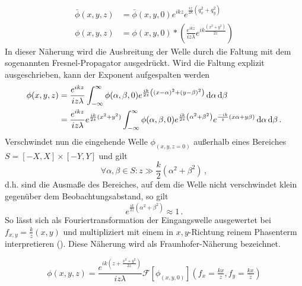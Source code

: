 \begin{align}
	\bar{\phi}(x,y, z) & =\bar{\phi}(x,y,0) e^{ik z}e^{\frac{i z}{2k}(q_x^2+q_y^2)} 
	\label{eq:fresnel_fourier}\\
	\phi(x,y, z)       & =\phi(x,y,0) \ast \left(                                   
	\frac{e^{ik z}}{i z \lambda } 
	e^{ik\frac{(x^2+y^2)}{2 z}}
	\right)
	\label{eq:fresnel_real}
\end{align}
In dieser Näherung wird die Ausbreitung der Welle durch die Faltung mit dem sogenannten Fresnel-Propagator ausgedrückt. Wird die Faltung explizit ausgeschrieben, kann der Exponent aufgespalten werden
\begin{align}
\label{eq:fresnel_explizit}
	\phi(x,y, z) & =\frac{e^{ikz}}{iz\lambda}                           
	\int_{-\infty}^\infty 
	\phi(\alpha,\beta,0)
	e^{\frac{ik}{2z}\left(\left(x-\alpha\right)^2+\left(y-\beta\right)^2\right)}
	\dif \alpha \dif \beta \nonumber \\
	             & =\frac{e^{ikz}}{iz\lambda}e^{\frac{ik}{2z}(x^2+y^2)} 
	\int_{-\infty}^\infty 
	\phi(\alpha,\beta,0)
	e^{\frac{ik}{2z}\left(\alpha^2+\beta^2\right)}
	e^{\frac{-ik}{ z}\left(x\alpha+y\beta\right)}
	\dif \alpha \dif \beta \,.
\end{align}
Verschwindet nun die eingehende Welle $\phi_(x,y,z=0)$ außerhalb eines Bereiches $S=[-X,X]\times[-Y,Y]$ und gilt 
\begin{equation}
	\forall \alpha,\beta \in S:	z\gg \frac{k}{2}\left(\alpha^2+\beta^2\right) \, , 
\end{equation}
d.h. sind die Ausmaße des Bereiches, auf dem die Welle nicht verschwindet klein gegenüber dem Beobachtungsabstand, so gilt
\begin{equation}
	e^{\frac{ik}{2z}\left(\alpha^2+\beta^2\right)}\approx 1 \,.
\end{equation}
So lässt sich  als Fouriertransformation der Eingangswelle ausgewertet bei $f_{x,y}=\tfrac{k}{z}(x,y)$ und multipliziert mit einem in $x,y$-Richtung reinem Phasenterm interpretieren (). Diese Näherung wird als Fraunhofer-Näherung bezeichnet.

\begin{equation}
\label{eq:fraunhofer}
	\phi(x,y,z)=\frac{e^{ik(z+\frac{x^2+y^2}{2z})}}{iz\lambda}\mathscr{F}\left[\phi_(x,y,0)\right](f_x=\tfrac{kx}{z},f_y=\tfrac{kx}{z})
\end{equation}


